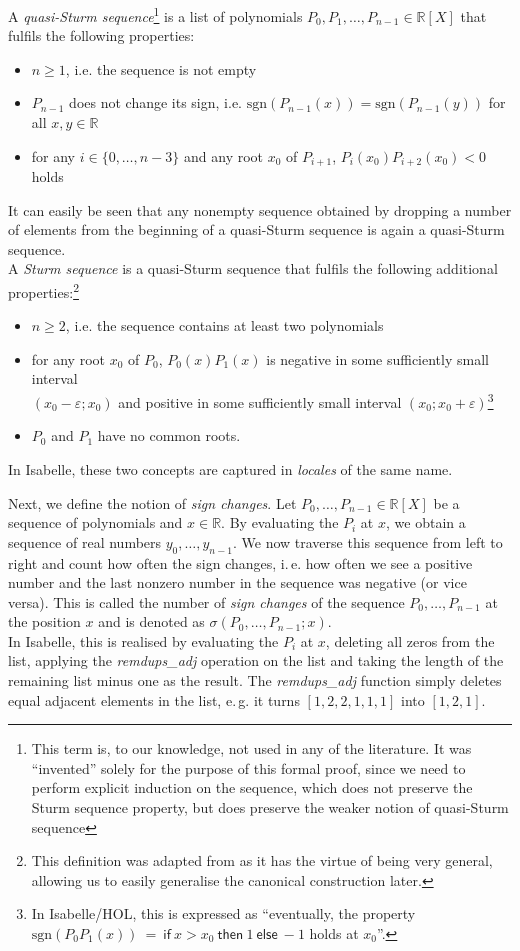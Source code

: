 \documentclass[11pt,a4paper,oneside]{article}
\newcommand{\RR}{\mathbb{R}}
\renewcommand{\epsilon}{\varepsilon}
\newcommand{\sgn}{\mathrm{sgn}}
\newcommand{\ie}{i.\,e.\xspace}
\newcommand{\eg}{e.\,g.\xspace}
\newcommand{\isabellehol}{\mbox{Isabelle}\slash HOL\xspace}
\begin{document}
A \emph{quasi-Sturm sequence}\footnote{This term is, to our knowledge, not used in any of the literature. It was \enquote{invented} solely for the purpose of this formal proof, since we need to perform explicit induction on the sequence, which does not preserve the Sturm sequence property, but does preserve the weaker notion of quasi-Sturm sequence} is a list of polynomials $P_0,P_1,\ldots,P_{n-1} \in \RR[X]$ that fulfils the following properties:
\begin{itemize}
\item $n \geq 1$, i.e. the sequence is not empty
\item $P_{n-1}$ does not change its sign, i.e. $\sgn(P_{n-1}(x))=\sgn(P_{n-1}(y))$ for all $x,y\in\RR$
\item for any $i\in\{0,\ldots,n-3\}$ and any root $x_0$ of $P_{i+1}$, $P_{i}(x_0)P_{i+2}(x_0) < 0$ holds
\end{itemize}
It can easily be seen that any nonempty sequence obtained by dropping a number of elements from the beginning of a quasi-Sturm sequence is again a quasi-Sturm sequence.\\

A \emph{Sturm sequence} is a quasi-Sturm sequence that fulfils the following additional properties:\footnote{This definition was adapted from \cite{sag} as it has the virtue of being very general, allowing us to easily generalise the canonical construction later.}
\begin{itemize}
\item $n \geq 2$, i.e. the sequence contains at least two polynomials
\item for any root $x_0$ of $P_0$, $P_0(x)P_1(x)$ is negative in some sufficiently small interval\\ \mbox{$(x_0-\epsilon;x_0)$} and positive in some sufficiently small interval $(x_0;x_0+\epsilon)$\footnote{
In \isabellehol, this is expressed as \enquote{eventually, the property $\sgn(P_0P_1(x))\ =\ \mathsf{if}\ x>x_0\ \mathsf{then}\ 1\ \mathsf{else}\ -1$ holds at $x_0$}.}
\item $P_0$ and $P_1$ have no common roots.
\end{itemize}

In Isabelle, these two concepts are captured in \emph{locales} of the same name.
\vskip5mm

Next, we define the notion of \emph{sign changes}. Let $P_0,\ldots,P_{n-1}\in\RR[X]$ be a sequence of polynomials and $x\in\RR$. By evaluating the $P_i$ at $x$, we obtain a sequence of real numbers $y_0,\ldots,y_{n-1}$. We now traverse this sequence from left to right and count how often the sign changes, \ie how often we see a positive number and the last nonzero number in the sequence was negative (or vice versa). This is called the number of \emph{sign changes} of the sequence $P_0,\ldots,P_{n-1}$ at the position $x$ and is denoted as $\sigma(P_0,\ldots,P_{n-1}; x)$.\\
In Isabelle, this is realised by evaluating the $P_i$ at $x$, deleting all zeros from the list, applying the \emph{remdups\_adj} operation on the list and taking the length of the remaining list minus one as the result. The \emph{remdups\_adj} function simply deletes equal adjacent elements in the list, \eg it turns $[1,2,2,1,1,1]$ into $[1,2,1]$.
\end{document}
